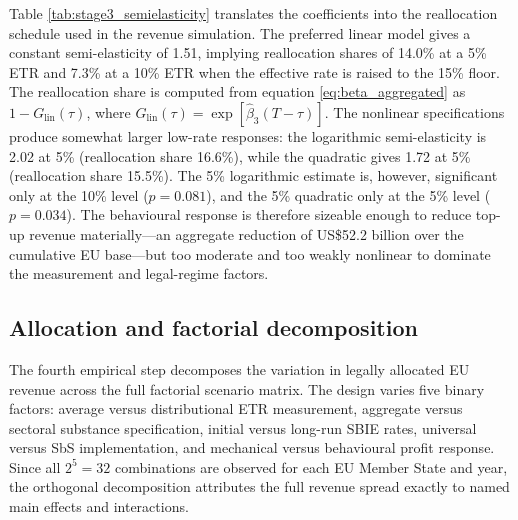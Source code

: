 \documentclass[11pt,a4paper]{article}
\begin{document}


Table \ref{tab:stage3_semielasticity} translates the coefficients into the reallocation schedule used in the revenue simulation. The preferred linear model gives a constant semi-elasticity of 1.51, implying reallocation shares of 14.0\% at a 5\% ETR and 7.3\% at a 10\% ETR when the effective rate is raised to the 15\% floor. The reallocation share is computed from equation \eqref{eq:beta_aggregated} as $1 - G_{\text{lin}}(\tau)$, where $G_{\text{lin}}(\tau) = \exp[\hat{\beta}_3 (T - \tau)]$. The nonlinear specifications produce somewhat larger low-rate responses: the logarithmic semi-elasticity is 2.02 at 5\% (reallocation share 16.6\%), while the quadratic gives 1.72 at 5\% (reallocation share 15.5\%). The 5\% logarithmic estimate is, however, significant only at the 10\% level ($p=0.081$), and the 5\% quadratic only at the 5\% level ($p=0.034$). The behavioural response is therefore sizeable enough to reduce top-up revenue materially---an aggregate reduction of US\$52.2 billion over the cumulative EU base---but too moderate and too weakly nonlinear to dominate the measurement and legal-regime factors.

\subsection{Allocation and factorial decomposition}\label{sec:results_factorial}

The fourth empirical step decomposes the variation in legally allocated EU revenue across the full factorial scenario matrix. The design varies five binary factors: average versus distributional ETR measurement, aggregate versus sectoral substance specification, initial versus long-run SBIE rates, universal versus SbS implementation, and mechanical versus behavioural profit response. Since all $2^5=32$ combinations are observed for each EU Member State and year, the orthogonal decomposition attributes the full revenue spread exactly to named main effects and interactions.



\end{document}
